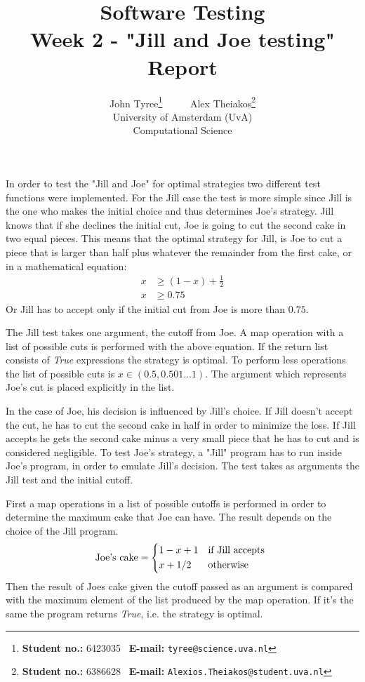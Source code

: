 \documentclass[11pt,a4paper]{article}
\title{\large{\textbf{Software Testing}} \\ [5pt]
\large{Week 2 - "Jill and Joe testing" Report}
}
\author{John Tyree\footnote{\textbf{Student no.:} 6423035 \textbar\ \textbf{E-mail:} \texttt{tyree@science.uva.nl}} \ \ \ \ \ Alex Theiakos\footnote{\textbf{Student no.:} 6386628 \textbar\ \textbf{E-mail:} \texttt{Alexios.Theiakos@student.uva.nl}} \\[15pt] University of Amsterdam (UvA) \\ Computational Science}
\date{}
\numberwithin{equation}{section}%
\begin{document}
\maketitle

In order to test the "Jill and Joe" for optimal strategies two different test functions were implemented.
For the Jill case the test is more simple since Jill is the one who makes the initial choice and thus determines Joe's strategy. Jill knows that if she declines the initial cut, Joe is going to cut the second cake in two equal pieces.
This means that the optimal strategy for Jill, is Joe to cut a piece that is larger than half plus whatever the remainder from the first cake, or in a mathematical equation:
\begin{align*}
    x &\geq (1 - x) + \frac{1}{2} \\
    x &\geq 0.75
\end{align*}
Or Jill has to accept only if the initial cut from Joe is more than $0.75$.

The Jill test takes one argument, the cutoff from Joe. A map operation with a list of possible cuts is performed with the above equation. If the return list consists of \emph{True} expressions the strategy is optimal. To perform less operations the list of possible cuts is $x\in (0.5,0.501...1)$. The argument which represents Joe's cut is placed explicitly in the list.

In the case of Joe, his decision is influenced by Jill's choice. If Jill doesn't accept the cut, he has to cut the second cake in half in order to minimize the loss. If Jill accepts he gets the second cake minus a very small piece that he has to cut and is considered negligible. 
To test Joe's strategy, a "Jill" program has to run inside Joe's program, in order to emulate Jill's decision. The test takes as arguments the Jill test and the initial cutoff. 

First a map operations in a list of possible cutoffs is performed in order to determine the maximum cake that Joe can have. The result depends on the choice of the Jill program.
\[
    \text{Joe's cake} =
    \begin{dcases*}
        1 - x + 1 & if Jill accepts \\
        x + 1/2 & otherwise
    \end{dcases*}
\]
Then the result of Joes cake given the cutoff passed as an argument is compared with the maximum element of the list produced by the map operation. If it's the same the program returns \emph{True}, i.e. the strategy is optimal.
\end{document}
